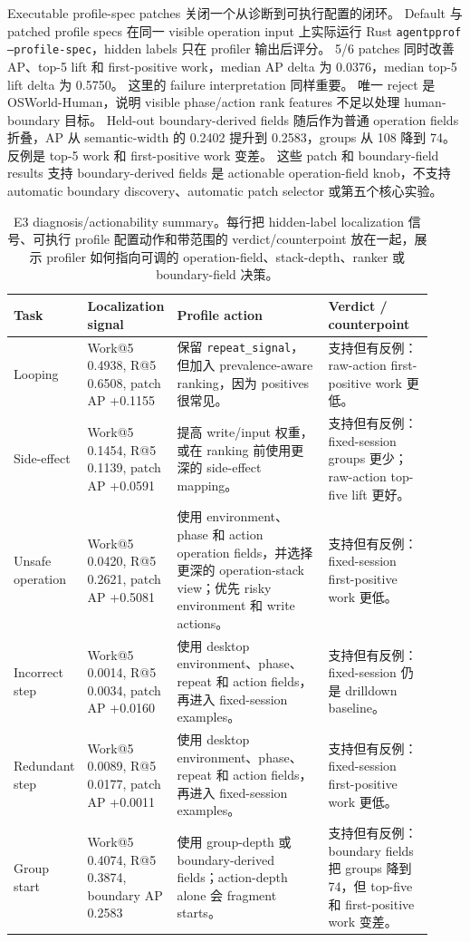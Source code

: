 \documentclass[10pt,twocolumn]{ctexart}
\begin{document}
Executable profile-spec patches 关闭一个从诊断到可执行配置的闭环。
Default 与 patched profile specs 在同一 visible operation input 上实际运行 Rust \texttt{agentpprof --profile-spec}，hidden labels 只在 profiler 输出后评分。
5/6 patches 同时改善 AP、top-5 lift 和 first-positive work，median AP delta 为 0.0376，median top-5 lift delta 为 0.5750。
这里的 failure interpretation 同样重要。
唯一 reject 是 OSWorld-Human，说明 visible phase/action rank features 不足以处理 human-boundary 目标。
Held-out boundary-derived fields 随后作为普通 operation fields 折叠，AP 从 semantic-width 的 0.2402 提升到 0.2583，groups 从 108 降到 74。
反例是 top-5 work 和 first-positive work 变差。
这些 patch 和 boundary-field results 支持 boundary-derived fields 是 actionable operation-field knob，不支持 automatic boundary discovery、automatic patch selector 或第五个核心实验。

\begin{table}[t]
  \centering
  \scriptsize
  \setlength{\tabcolsep}{2.5pt}
  \renewcommand{\arraystretch}{0.92}
  \caption{E3 diagnosis/actionability summary。每行把 hidden-label localization 信号、可执行 profile 配置动作和带范围的 verdict/counterpoint 放在一起，展示 profiler 如何指向可调的 operation-field、stack-depth、ranker 或 boundary-field 决策。}
  \label{tab:actionability}
  \begin{tabular}{p{0.13\linewidth}p{0.18\linewidth}p{0.36\linewidth}p{0.25\linewidth}}
    \toprule
    Task & Localization signal & Profile action & Verdict / counterpoint \\
    \midrule
    Looping & Work@5 0.4938, R@5 0.6508, patch AP +0.1155 & 保留 \texttt{repeat\_signal}，但加入 prevalence-aware ranking，因为 positives 很常见。 & 支持但有反例：raw-action first-positive work 更低。 \\
    Side-effect & Work@5 0.1454, R@5 0.1139, patch AP +0.0591 & 提高 write/input 权重，或在 ranking 前使用更深的 side-effect mapping。 & 支持但有反例：fixed-session groups 更少；raw-action top-five lift 更好。 \\
    Unsafe operation & Work@5 0.0420, R@5 0.2621, patch AP +0.5081 & 使用 environment、phase 和 action operation fields，并选择更深的 operation-stack view；优先 risky environment 和 write actions。 & 支持但有反例：fixed-session first-positive work 更低。 \\
    Incorrect step & Work@5 0.0014, R@5 0.0034, patch AP +0.0160 & 使用 desktop environment、phase、repeat 和 action fields，再进入 fixed-session examples。 & 支持但有反例：fixed-session 仍是 drilldown baseline。 \\
    Redundant step & Work@5 0.0089, R@5 0.0177, patch AP +0.0011 & 使用 desktop environment、phase、repeat 和 action fields，再进入 fixed-session examples。 & 支持但有反例：fixed-session first-positive work 更低。 \\
    Group start & Work@5 0.4074, R@5 0.3874, boundary AP 0.2583 & 使用 group-depth 或 boundary-derived fields；action-depth alone 会 fragment starts。 & 支持但有反例：boundary fields 把 groups 降到 74，但 top-five 和 first-positive work 变差。 \\
    \bottomrule
  \end{tabular}
\end{table}
\end{document}
